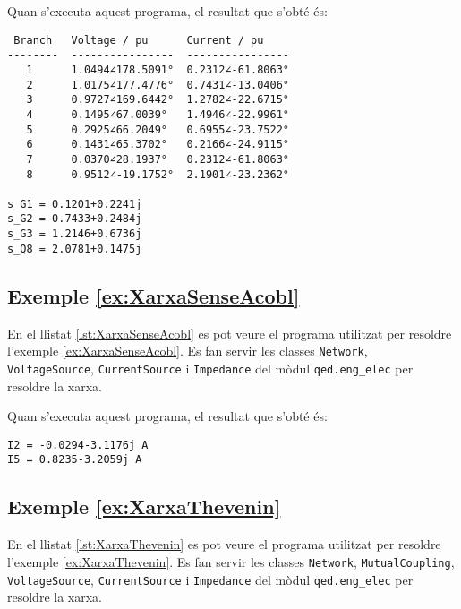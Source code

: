 Quan s'executa aquest programa, el resultat que s'obté és:
\lstset{
	language=,
	numbers=none,
	frame=none
}
\begin{lstlisting}
 Branch   Voltage / pu      Current / pu
--------  ----------------  ----------------
   1      1.0494∠178.5091°  0.2312∠-61.8063°
   2      1.0175∠177.4776°  0.7431∠-13.0406°
   3      0.9727∠169.6442°  1.2782∠-22.6715°
   4      0.1495∠67.0039°   1.4946∠-22.9961°
   5      0.2925∠66.2049°   0.6955∠-23.7522°
   6      0.1431∠65.3702°   0.2166∠-24.9115°
   7      0.0370∠28.1937°   0.2312∠-61.8063°
   8      0.9512∠-19.1752°  2.1901∠-23.2362°

s_G1 = 0.1201+0.2241j
s_G2 = 0.7433+0.2484j
s_G3 = 1.2146+0.6736j
s_Q8 = 2.0781+0.1475j
\end{lstlisting} 


\hypertarget{exemple:XarxaSenseAcobl}{\subsection{Exemple \ref*{ex:XarxaSenseAcobl} \XarxaSenseAcobl}}
En el llistat \vref{lst:XarxaSenseAcobl} es pot veure el programa utilitzat per resoldre l'exemple \vref{ex:XarxaSenseAcobl}. Es fan servir les classes \texttt{Network},  \texttt{VoltageSource}, \texttt{CurrentSource} i \texttt{Impedance} del mòdul \texttt{qed.eng\_elec} per resoldre la xarxa.


Quan s'executa aquest programa, el resultat que s'obté és:
\lstset{
	language=,
	numbers=none,
	frame=none
}
\begin{lstlisting}
I2 = -0.0294-3.1176j A
I5 = 0.8235-3.2059j A
\end{lstlisting} 

\hypertarget{exemple:XarxaThevenin}{\subsection{Exemple \ref*{ex:XarxaThevenin} \XarxaThevenin}}
En el llistat \vref{lst:XarxaThevenin} es pot veure el programa utilitzat per resoldre l'exemple \vref{ex:XarxaThevenin}. Es fan servir les classes \texttt{Network}, \texttt{MutualCoupling}, \texttt{VoltageSource}, \texttt{CurrentSource} i \texttt{Impedance} del mòdul \texttt{qed.eng\_elec} per resoldre la xarxa.


